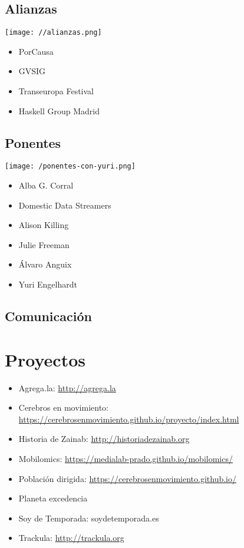 \documentclass[11pt]{article}
\begin{document}
\subsection*{Alianzas}
\label{sec:org519870a}
\begin{center}
\texttt{[image: //alianzas.png]}
\end{center}

\begin{itemize}
\item PorCausa
\item GVSIG
\item Transeuropa Festival
\item Haskell Group Madrid
\end{itemize}

\subsection*{Ponentes}
\label{sec:orgc76e96f}
\begin{center}
\texttt{[image: /ponentes-con-yuri.png]}
\end{center}

\begin{itemize}
\item Alba G. Corral
\item Domestic Data Streamers
\item Alison Killing
\item Julie Freeman
\item Álvaro Anguix
\item Yuri Engelhardt
\end{itemize}

\subsection*{Comunicación}
\label{sec:orgbcee51f}


\section*{Proyectos}
\label{sec:org4fd7846}
\begin{itemize}
\item Agrega.la: \url{http://agrega.la}
\item Cerebros en movimiento: \url{https://cerebrosenmovimiento.github.io/proyecto/index.html}
\item Historia de Zainab: \url{http://historiadezainab.org}
\item Mobilomics: \url{https://medialab-prado.github.io/mobilomics/}
\item Población dirigida: \url{https://cerebrosenmovimiento.github.io/}
\item Planeta excedencia
\item Soy de Temporada: soydetemporada.es
\item Trackula: \url{http://trackula.org}
\end{itemize}
\end{document}
